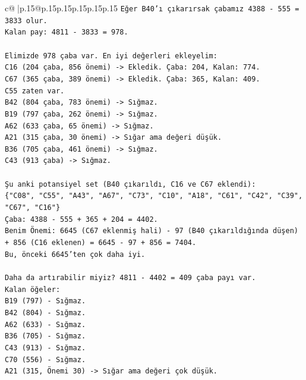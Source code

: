 \documentclass{article}
\begin{document}
{\begin{supertabular}{c@{$\;$}|p{.15\linewidth}@{}p{.15\linewidth}p{.15\linewidth}p{.15\linewidth}p{.15\linewidth}p{.15\linewidth}}
{{{\texttt{Eğer B40'ı çıkarırsak çabamız 4388 {-} 555 = 3833 olur.} \\
\texttt{Kalan pay: 4811 {-} 3833 = 978.} \\
\\ 
\texttt{Elimizde 978 çaba var. En iyi değerleri ekleyelim:} \\
\texttt{C16 (204 çaba, 856 önemi) {-}> Ekledik. Çaba: 204, Kalan: 774.} \\
\texttt{C67 (365 çaba, 389 önemi) {-}> Ekledik. Çaba: 365, Kalan: 409.} \\
\texttt{C55 zaten var.} \\
\texttt{B42 (804 çaba, 783 önemi) {-}> Sığmaz.} \\
\texttt{B19 (797 çaba, 262 önemi) {-}> Sığmaz.} \\
\texttt{A62 (633 çaba, 65 önemi) {-}> Sığmaz.} \\
\texttt{A21 (315 çaba, 30 önemi) {-}> Sığar ama değeri düşük.} \\
\texttt{B36 (705 çaba, 461 önemi) {-}> Sığmaz.} \\
\texttt{C43 (913 çaba) {-}> Sığmaz.} \\
\\ 
\texttt{Şu anki potansiyel set (B40 çıkarıldı, C16 ve C67 eklendi):} \\
\texttt{\{"C08", "C55", "A43", "A67", "C73", "C10", "A18", "C61", "C42", "C39", "C67", "C16"\}} \\
\texttt{Çaba: 4388 {-} 555 + 365 + 204 = 4402.} \\
\texttt{Benim Önemi: 6645 (C67 eklenmiş hali) {-} 97 (B40 çıkarıldığında düşen) + 856 (C16 eklenen) = 6645 {-} 97 + 856 = 7404.} \\
\texttt{Bu, önceki 6645'ten çok daha iyi.} \\
\\ 
\texttt{Daha da artırabilir miyiz? 4811 {-} 4402 = 409 çaba payı var.} \\
\texttt{Kalan öğeler:} \\
\texttt{B19 (797) {-} Sığmaz.} \\
\texttt{B42 (804) {-} Sığmaz.} \\
\texttt{A62 (633) {-} Sığmaz.} \\
\texttt{B36 (705) {-} Sığmaz.} \\
\texttt{C43 (913) {-} Sığmaz.} \\
\texttt{C70 (556) {-} Sığmaz.} \\
\texttt{A21 (315, Önemi 30) {-}> Sığar ama değeri çok düşük.} \\
}}}
\end{supertabular}}
\end{document}
